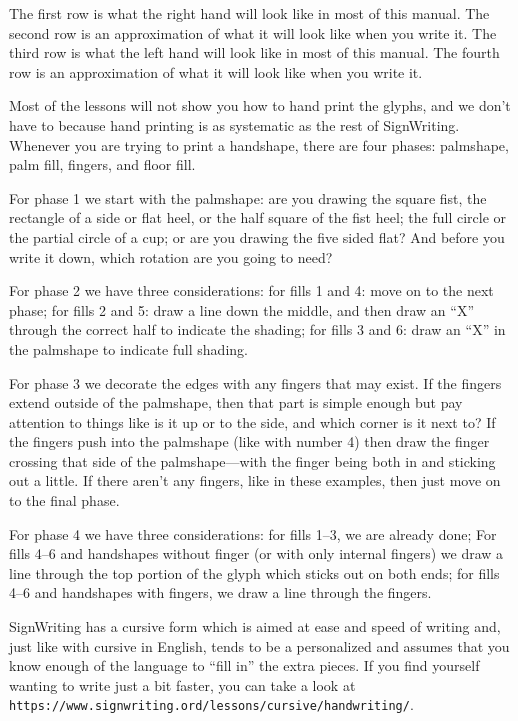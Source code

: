 \documentclass{article}
\begin{document}
The first row is what the right hand will look like in most of this manual.
The second row is an approximation of what it will look like when you write it.
The third row is what the left hand will look like in most of this manual.
The fourth row is an approximation of what it will look like when you write it.

Most of the lessons will not show you how to hand print the glyphs, and we don't have to because hand printing is as systematic as the rest of SignWriting.
Whenever you are trying to print a handshape, there are four phases: palmshape, palm fill, fingers, and floor fill.

For phase 1 we start with the palmshape:
are you drawing the square fist, the rectangle of a side or flat heel, or the half square of the fist heel;
the full circle or the partial circle of a cup;
or are you drawing the five sided flat?
And before you write it down, which rotation are you going to need?

For phase 2 we have three considerations:
for fills 1 and 4: move on to the next phase;
for fills 2 and 5: draw a line down the middle, and then draw an ``X'' through the correct half to indicate the shading;
for fills 3 and 6: draw an ``X'' in the palmshape to indicate full shading.

For phase 3 we decorate the edges with any fingers that may exist.
If the fingers extend outside of the palmshape, then that part is simple enough but pay attention to things like is it up or to the side, and which corner is it next to?
If the fingers push into the palmshape (like with number 4) then draw the finger crossing that side of the palmshape---with the finger being both in and sticking out a little.
If there aren't any fingers, like in these examples, then just move on to the final phase.

For phase 4 we have three considerations:
for fills 1--3, we are already done;
For fills 4--6 and handshapes without finger (or with only internal fingers) we draw a line through the top portion of the glyph which sticks out on both ends;
for fills 4--6 and handshapes with fingers, we draw a line through the fingers.

SignWriting has a cursive form which is aimed at ease and speed of writing and, just like with cursive in English, tends to be a personalized and assumes that you know enough of the language to ``fill in'' the extra pieces.
If you find yourself wanting to write just a bit faster, you can take a look at \texttt{https://www.signwriting.ord/lessons/cursive/handwriting/}.
\end{document}
